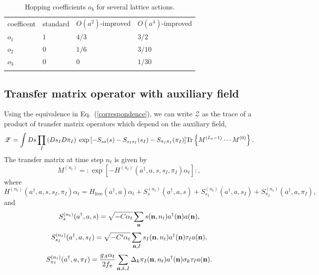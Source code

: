 \begin{table}[tbh]
\caption{Hopping coefficients $o_k$ for several lattice actions.}%
\begin{center}
\label{hopping_coeff_2}%

\begin{tabular}{p{2cm}p{3cm}p{3cm}p{3cm}}
\hline\noalign{\smallskip}
coefficent& standard & $O(a^{2})$-improved & $O(a^{4})$-improved \\
\noalign{\smallskip}\svhline\noalign{\smallskip}
$o_{1}$ & $1$ & $4/3$ & $3/2$\\
$o_{2}$ & $0$ & $1/6$ & $3/10$\\
$o_{3}$ & $0$ & $0$ & $1/30$ \\
\noalign{\smallskip}\hline\noalign{\smallskip}
\end{tabular}
\end{center}
\end{table}

\subsection{Transfer matrix operator with auxiliary field}
Using the equivalence in Eq.~(\ref{correspondence}), we can write $\mathcal{Z}$
as the trace of a product of transfer matrix operators which depend on the
auxiliary field,
\begin{equation}
\mathcal{Z} = \int Ds \prod_I \left(Ds_I D\pi_I\right) \; 
\exp{\left[-S_{ss}(s)
-S_{s_Is_I}(s_I)
-S_{\pi_I\pi_I}(\pi_I)\right]}
 {\rm Tr}\left\{ M^{(L_t-1)}\cdots M^{(0)}\right\}.
\end{equation}
The transfer matrix at time step $n_t$ is given by
\begin{equation}
M^{(n_t)}=\colon\exp\left[ -H^{(n_t)}(a^{\dagger},a,s,s_I,\pi_I)\alpha_{t}
\right]
\colon,
\end{equation}
where
\begin{equation}
H^{(n_t)}(a^{\dagger},a,s,s_I,\pi_I)\alpha_{t}=H_{\text{free}}(a^{\dagger},a)\alpha_{t}+S^{(n_t)}_s(a^{\dagger},a,s)+S^{(n_t)}_{s_I}(a^{\dagger},a,s_{I})+S^{(n_t)}_{\pi_I}(a^{\dagger},a,\pi_{I}),
\end{equation}
and
\begin{equation}
S^{(n_t)}_{s}(a^{\dagger},a,s) =  \sqrt{-C\alpha_{t}} \sum_{\bf n} s({\bf
n},n_t)a^{\dagger}({\bf
n})a({\bf n}),  
\end{equation}
\begin{equation}
S^{(n_t)}_{s_I}(a^{\dagger},a,s_{I}) = \sqrt{-C'\alpha_{t}} \sum_{{\bf n},I}
s_{I}({\bf
n},n_t)a^{\dagger}({\bf
n})\tau_Ia({\bf n}),
\end{equation}
\begin{equation}
S^{(n_t)}_{\pi_I}(a^{\dagger},a,\pi_{I}) = \frac{g_A \alpha_t}{2 f_{\pi}}
\sum_{{\bf n},k,I}
\Delta_k \pi_{I}({\bf
n},n_t)a^{\dagger}({\bf
n})\sigma_k\tau_I a({\bf n}).
\end{equation}

